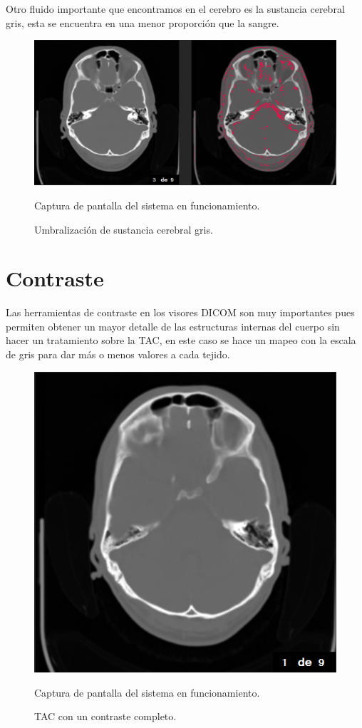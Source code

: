 \documentclass[12pt]{report}
\begin{document}
\newpage
\vspace*{3cm}
Otro fluido importante que encontramos en el cerebro es la sustancia cerebral gris, esta se encuentra en una menor proporción que la sangre.
\begin{figure}[H]
\centering
\includegraphics[width = 15 cm, height = 8 cm]{umbralSustanciaCerebralGris}
\caption{Umbralización de sustancia cerebral gris.}
Captura de pantalla del sistema en funcionamiento.
\end{figure}

\newpage
\section{Contraste}
Las herramientas de contraste en los visores DICOM son muy importantes pues permiten obtener un mayor detalle de las estructuras internas del cuerpo sin hacer un tratamiento sobre la TAC, en este caso se hace un mapeo con la escala de gris para dar más o menos valores a cada tejido.
\vspace{2cm}
\begin{figure}[H]
\centering
\includegraphics[width = 7 cm, height = 7 cm]{contrasteDefault}
\caption{TAC con un contraste completo.}
Captura de pantalla del sistema en funcionamiento.
\end{figure}
\end{document}
